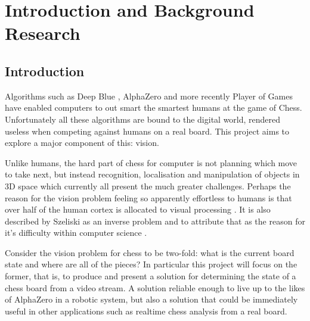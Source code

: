 \chapter{Introduction and Background Research}

\label{chapter1}

\section{Introduction}

Algorithms such as Deep Blue \cite{CAMPBELL200257}, AlphaZero \cite{silver2018general} and more recently Player of Games\cite{schmid2021player}
have enabled computers to out smart the smartest humans at the game of Chess.
Unfortunately all these algorithms are bound to the digital world, rendered useless when
competing against humans on a real board.  This project aims to explore a major component of this: vision.

Unlike humans, the hard part of chess for computer is not planning which move to take next, but instead recognition, 
localisation and manipulation of objects in 3D space which currently all present the much greater challenges.
Perhaps the reason for the vision problem feeling so apparently effortless to humans is that over half of the human cortex is allocated 
to visual processing \cite{snowden2012basic}.
It is also described by Szeliski as an inverse problem and to attribute that as the reason for it's difficulty
within computer science \cite{szeliski2011computer}.

Consider the vision problem for chess to be two-fold: what is the current board state and where are all of the pieces?  
In particular this project will focus on the former, that is, to produce and present a solution for determining the
state of a chess board from a video stream.  A solution reliable enough to live up to the likes of AlphaZero 
in a robotic system,
but also a solution that could be immediately useful in other applications such as realtime chess analysis from a real board.

